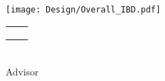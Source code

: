 
\settowidth{\unitlength}{\titleMain}

\begin{titlingpage}
\centering

{
	\color{LightGoldenrod}
	\resizebox*{\unitlength}{\baselineskip}{\rotateright{$\}$}}
} \\ [\baselineskip]

{
	\color{Sienna}
	\titleMain
} \\ [\baselineskip]


{
	\color{RosyBrown}
	\titleSemester \\
}

{
	\color{LightGoldenrod}
	\resizebox*{\unitlength}{\baselineskip}{\rotateleft{$\}$}}
}

\vfill

\texttt{[image: Design/Overall\_IBD.pdf]}

\vfill

\begin{tabu} to \linewidth {X[1,c] X[1,c]}
\authorOneName						& \authorTwoName \\
\authorOneID						& \authorTwoID \\
									& \\
\end{tabu} \\ [2\baselineskip]

{
	{\Large Advisor} \\
	\advisorName
}

\end{titlingpage}
